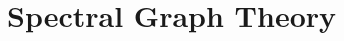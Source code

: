 \documentclass[12pt,a4paper,openany]{book}
\begin{document}
\part{Spectral Graph Theory}
\label{part:sg}














% 
% 

% 
% 
\end{document}
